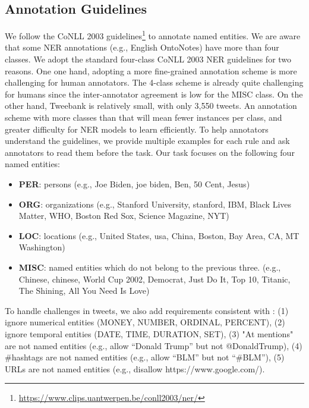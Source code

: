 \documentclass[10pt, a4paper]{article}
\begin{document}
\subsection{Annotation Guidelines}
We follow the CoNLL 2003 guidelines\footnote{\url{https://www.clips.uantwerpen.be/conll2003/ner/}} to annotate named entities. We are aware that some NER annotations (e.g., English OntoNotes) have more than four classes. We adopt the standard four-class CoNLL 2003 NER guidelines for two reasons. One one hand, adopting a more fine-grained annotation scheme is more challenging for human annotators. The 4-class scheme is already quite challenging for humans since the inter-annotator agreement is low for the MISC class. On the other hand, Tweebank is relatively small, with only 3,550 tweets. An annotation scheme with more classes than that will mean fewer instances per class, and greater difficulty for NER models to learn efficiently. To help annotators understand the guidelines, we provide multiple examples for each rule and ask annotators to read them before the task. Our task focuses on the following four named entities:
\begin{itemize}
\setlength\itemsep{0em}
\item \textbf{PER}: persons (e.g., Joe Biden, joe biden, Ben, 50 Cent, Jesus)
\item \textbf{ORG}: organizations (e.g., Stanford University, stanford, IBM, Black Lives Matter, WHO, Boston Red Sox, Science Magazine, NYT) 
\item \textbf{LOC}: locations (e.g., United States, usa, China, Boston, Bay Area, CA, MT Washington)
\item \textbf{MISC}: named entities which do not belong to the previous three. (e.g., Chinese, chinese, World Cup 2002, Democrat, Just Do It, Top 10, Titanic, The Shining, All You Need Is Love)
\end{itemize}

To handle challenges in tweets, we also add requirements consistent with \cite{ritter2011named}: (1) ignore numerical entities (MONEY, NUMBER, ORDINAL, PERCENT), (2) ignore temporal entities (DATE, TIME, DURATION, SET), (3) "At mentions" are not named entities (e.g., allow ``Donald Trump'' but not @DonaldTrump), (4) \#hashtags are not named entities (e.g., allow ``BLM'' but not ``\#BLM''), (5) URLs are not named entities (e.g., disallow https://www.google.com/). 
\end{document}
